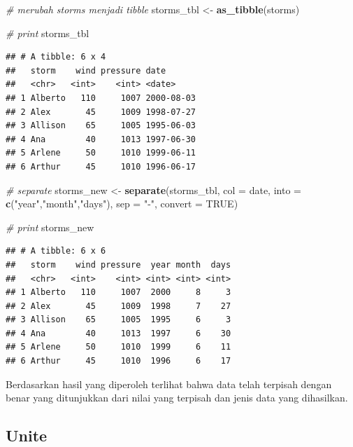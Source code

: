 \documentclass[]{book}
\newenvironment{Shaded}{\begin{snugshade}}{\end{snugshade}}
\newcommand{\KeywordTok}[1]{\textcolor[rgb]{0.13,0.29,0.53}{\textbf{#1}}}
\newcommand{\DataTypeTok}[1]{\textcolor[rgb]{0.13,0.29,0.53}{#1}}
\newcommand{\StringTok}[1]{\textcolor[rgb]{0.31,0.60,0.02}{#1}}
\newcommand{\CommentTok}[1]{\textcolor[rgb]{0.56,0.35,0.01}{\textit{#1}}}
\newcommand{\OtherTok}[1]{\textcolor[rgb]{0.56,0.35,0.01}{#1}}
\newcommand{\NormalTok}[1]{#1}
\begin{document}
\begin{Shaded}
\begin{Highlighting}[]
\CommentTok{# merubah storms menjadi tibble}
\NormalTok{storms_tbl <-}\StringTok{ }\KeywordTok{as_tibble}\NormalTok{(storms)}

\CommentTok{# print}
\NormalTok{storms_tbl}
\end{Highlighting}
\end{Shaded}

\begin{verbatim}
## # A tibble: 6 x 4
##   storm    wind pressure date      
##   <chr>   <int>    <int> <date>    
## 1 Alberto   110     1007 2000-08-03
## 2 Alex       45     1009 1998-07-27
## 3 Allison    65     1005 1995-06-03
## 4 Ana        40     1013 1997-06-30
## 5 Arlene     50     1010 1999-06-11
## 6 Arthur     45     1010 1996-06-17
\end{verbatim}

\begin{Shaded}
\begin{Highlighting}[]
\CommentTok{# separate}
\NormalTok{storms_new <-}\StringTok{ }\KeywordTok{separate}\NormalTok{(storms_tbl,}
                       \DataTypeTok{col =}\NormalTok{ date,}
                       \DataTypeTok{into =} \KeywordTok{c}\NormalTok{(}\StringTok{"year"}\NormalTok{,}\StringTok{"month"}\NormalTok{,}\StringTok{"days"}\NormalTok{),}
                       \DataTypeTok{sep =} \StringTok{"-"}\NormalTok{,}
                       \DataTypeTok{convert =} \OtherTok{TRUE}\NormalTok{)}

\CommentTok{# print}
\NormalTok{storms_new}
\end{Highlighting}
\end{Shaded}

\begin{verbatim}
## # A tibble: 6 x 6
##   storm    wind pressure  year month  days
##   <chr>   <int>    <int> <int> <int> <int>
## 1 Alberto   110     1007  2000     8     3
## 2 Alex       45     1009  1998     7    27
## 3 Allison    65     1005  1995     6     3
## 4 Ana        40     1013  1997     6    30
## 5 Arlene     50     1010  1999     6    11
## 6 Arthur     45     1010  1996     6    17
\end{verbatim}

Berdasarkan hasil yang diperoleh terlihat bahwa data telah terpisah
dengan benar yang ditunjukkan dari nilai yang terpisah dan jenis data
yang dihasilkan.

\subsection{Unite}\label{unite}
\end{document}
